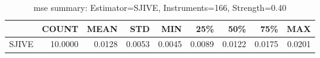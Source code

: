 \begin{table}[ht]
\centering
\caption{mse summary: Estimator=SJIVE, Instruments=166, Strength=0.40}
\begin{tabular}{lrrrrrrrr}
\toprule
 & COUNT & MEAN & STD & MIN & 25\% & 50\% & 75\% & MAX \\
\midrule
SJIVE & 10.0000 & 0.0128 & 0.0053 & 0.0045 & 0.0089 & 0.0122 & 0.0175 & 0.0201 \\
\bottomrule
\end{tabular}
\end{table}
